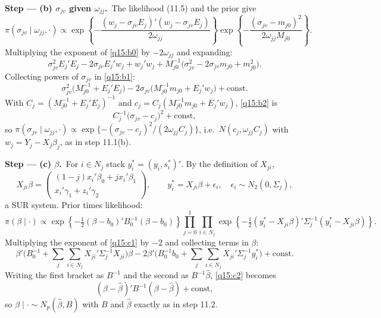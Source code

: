 \documentclass[11pt,a4paper]{article}
\newcommand{\passo}[2]{\par\smallskip\noindent\textbf{Step --- #1.}~#2}
\begin{document}
\begin{sol}
\passo{(b) $\sigma_{jv}$ given $\omega_{jj}$}{The likelihood (11.5) and the prior give
\begin{equation}
\pi(\sigma_{jv}\mid\omega_{jj},\cdot)\propto\exp\left\{-\frac{(w_j-\sigma_{jv}E_j)'(w_j-\sigma_{jv}E_j)}{2\omega_{jj}}\right\}\exp\left\{-\frac{(\sigma_{jv}-m_{j0})^2}{2\omega_{jj}M_{j0}}\right\}.\label{q15:b0}
\end{equation}
Multiplying the exponent of \eqref{q15:b0} by $-2\omega_{jj}$ and expanding:
\begin{equation}
\sigma_{jv}^2E_j'E_j-2\sigma_{jv}E_j'w_j+w_j'w_j+M_{j0}^{-1}\big(\sigma_{jv}^2-2\sigma_{jv}m_{j0}+m_{j0}^2\big).\label{q15:b1}
\end{equation}
Collecting powers of $\sigma_{jv}$ in \eqref{q15:b1}:
\begin{equation}
\sigma_{jv}^2\big(M_{j0}^{-1}+E_j'E_j\big)-2\sigma_{jv}\big(M_{j0}^{-1}m_{j0}+E_j'w_j\big)+\text{const}.\label{q15:b2}
\end{equation}
With $C_j=(M_{j0}^{-1}+E_j'E_j)^{-1}$ and $c_j=C_j(M_{j0}^{-1}m_{j0}+E_j'w_j)$, \eqref{q15:b2} is
\begin{equation}
C_j^{-1}\big(\sigma_{jv}-c_j\big)^2+\text{const},\label{q15:b3}
\end{equation}
so $\pi(\sigma_{jv}\mid\omega_{jj},\cdot)\propto\exp\{-(\sigma_{jv}-c_j)^2/(2\omega_{jj}C_j)\}$, i.e.\
$N(c_j,\omega_{jj}C_j)$ with $w_j=Y_j-X_j\beta_j$, as in step 11.1(b).}

\passo{(c) $\beta$}{For $i\in N_j$ stack $y_i^*=(y_i,s_i^*)'$. By the definition of $X_{ji}$,
\begin{equation}
X_{ji}\beta=\begin{pmatrix}(1-j)x_i'\beta_0+jx_i'\beta_1\\x_i'\gamma_1+z_i'\gamma_2\end{pmatrix},\qquad y_i^*=X_{ji}\beta+\epsilon_i,\quad\epsilon_i\sim N_2(0,\Sigma_j),\label{q15:c0}
\end{equation}
a SUR system. Prior times likelihood:
\begin{equation}
\pi(\beta\mid\cdot)\propto\exp\left\{-\tfrac12(\beta-b_0)'B_0^{-1}(\beta-b_0)\right\}\prod_{j=0}^{1}\prod_{i\in N_j}\exp\left\{-\tfrac12(y_i^*-X_{ji}\beta)'\Sigma_j^{-1}(y_i^*-X_{ji}\beta)\right\}.\label{q15:c1}
\end{equation}
Multiplying the exponent of \eqref{q15:c1} by $-2$ and collecting terms in $\beta$:
\begin{equation}
\beta'\Big(B_0^{-1}+\sum_{j}\sum_{i\in N_j}X_{ji}'\Sigma_j^{-1}X_{ji}\Big)\beta-2\beta'\Big(B_0^{-1}b_0+\sum_{j}\sum_{i\in N_j}X_{ji}'\Sigma_j^{-1}y_i^*\Big)+\text{const}.\label{q15:c2}
\end{equation}
Writing the first bracket as $B^{-1}$ and the second as $B^{-1}\hat\beta$, \eqref{q15:c2} becomes
\begin{equation}
(\beta-\hat\beta)'B^{-1}(\beta-\hat\beta)+\text{const},\label{q15:c3}
\end{equation}
so $\beta\mid\cdot\sim N_p(\hat\beta,B)$ with $B$ and $\hat\beta$ exactly as in step 11.2.}


\end{sol}
\end{document}
